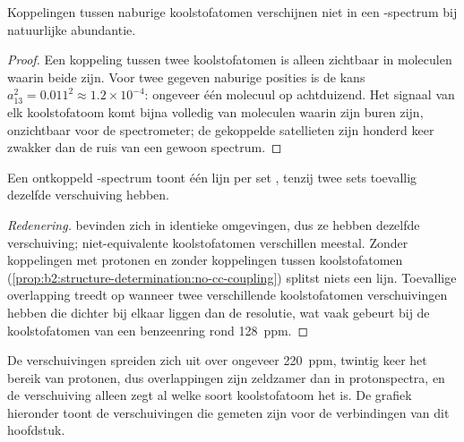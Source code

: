 \begin{proposition}\label{prop:b2:structure-determination:no-cc-coupling}
Koppelingen tussen naburige koolstofatomen verschijnen niet in een -spectrum bij natuurlijke
abundantie.
\end{proposition}

\begin{proof}
Een koppeling tussen twee koolstofatomen is alleen zichtbaar in moleculen waarin beide  zijn. Voor twee gegeven
naburige posities is de kans $a_{13}^2 = 0.011^2 \approx 1.2 \times 10^{-4}$: ongeveer één
molecuul op achtduizend. Het signaal van elk koolstofatoom komt bijna volledig van moleculen waarin zijn
buren  zijn, onzichtbaar voor de spectrometer; de gekoppelde satellieten zijn honderd keer
zwakker dan de ruis van een gewoon spectrum.
\end{proof}

\begin{proposition}\label{prop:b2:structure-determination:signals}
Een ontkoppeld -spectrum toont één lijn per set , tenzij twee sets toevallig
dezelfde verschuiving hebben.
\end{proposition}

\begin{proof}[Redenering]
 bevinden zich in identieke omgevingen, dus ze hebben dezelfde verschuiving; niet-equivalente koolstofatomen
verschillen meestal. Zonder koppelingen met protonen en zonder koppelingen tussen koolstofatomen
(\cref{prop:b2:structure-determination:no-cc-coupling}) splitst niets een lijn. Toevallige overlapping
treedt op wanneer twee verschillende koolstofatomen verschuivingen hebben die dichter bij elkaar liggen dan de resolutie, wat vaak gebeurt bij de
koolstofatomen van een benzeenring rond \qty{128}{ppm}.
\end{proof}

De verschuivingen spreiden zich uit over ongeveer \qty{220}{ppm}, twintig keer het bereik van protonen, dus overlappingen zijn zeldzamer dan
in protonspectra, en de verschuiving alleen zegt al welke soort koolstofatoom het is. De grafiek hieronder toont de verschuivingen
die gemeten zijn voor de verbindingen van dit hoofdstuk.

